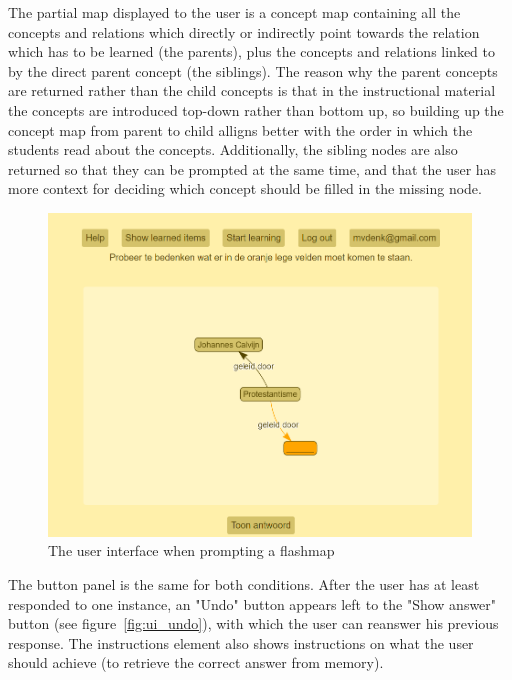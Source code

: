 The partial map displayed to the user is a concept map containing all the concepts and relations which directly or indirectly point towards the relation which has to be learned (the parents), plus the concepts and relations linked to by the direct parent concept (the siblings). The reason why the parent concepts are returned rather than the child concepts is that in the instructional material the concepts are introduced top-down rather than bottom up, so building up the concept map from parent to child alligns better with the order in which the students read about the concepts. Additionally, the sibling nodes are also returned so that they can be prompted at the same time, and that the user has more context for deciding which concept should be filled in the missing node.

\begin{figure}
    \centering
    \includegraphics[width=.8\textwidth]{img/ui_fm_prompt.png}
    \caption{The user interface when prompting a flashmap}
    \label{fig:ui_fm_prompt}
\end{figure}

The button panel is the same for both conditions. After the user has at least responded to one instance, an "Undo" button appears left to the "Show answer" button (see figure~\ref{fig:ui_undo}), with which the user can reanswer his previous response. The instructions element also shows instructions on what the user should achieve (to retrieve the correct answer from memory).

